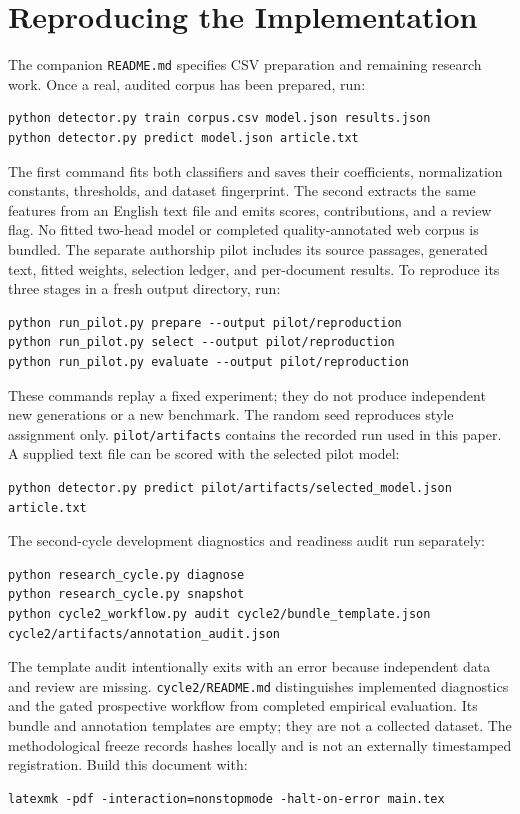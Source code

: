 \documentclass[11pt]{article}
\begin{document}
\appendix
\section{Reproducing the Implementation}
The companion \texttt{README.md} specifies CSV preparation and remaining
research work. Once a real, audited corpus has been prepared, run:
\begin{lstlisting}
python detector.py train corpus.csv model.json results.json
python detector.py predict model.json article.txt
\end{lstlisting}
The first command fits both classifiers and saves their coefficients,
normalization constants, thresholds, and dataset fingerprint. The second
extracts the same features from an English text file and emits scores,
contributions, and a review flag. No fitted two-head model or completed
quality-annotated web corpus is bundled. The separate authorship pilot includes
its source passages, generated text, fitted weights, selection ledger, and
per-document results. To reproduce its three stages in a fresh output
directory, run:
\begin{lstlisting}
python run_pilot.py prepare --output pilot/reproduction
python run_pilot.py select --output pilot/reproduction
python run_pilot.py evaluate --output pilot/reproduction
\end{lstlisting}
These commands replay a fixed experiment; they do not produce independent
new generations or a new benchmark. The random seed reproduces style
assignment only. \texttt{pilot/artifacts} contains the recorded run used in
this paper. A supplied text file can be scored with the selected pilot model:
\begin{lstlisting}
python detector.py predict pilot/artifacts/selected_model.json article.txt
\end{lstlisting}
The second-cycle development diagnostics and readiness audit run separately:
\begin{lstlisting}
python research_cycle.py diagnose
python research_cycle.py snapshot
python cycle2_workflow.py audit cycle2/bundle_template.json cycle2/artifacts/annotation_audit.json
\end{lstlisting}
The template audit intentionally exits with an error because independent
data and review are missing. \texttt{cycle2/README.md} distinguishes
implemented diagnostics and the gated prospective workflow from completed
empirical evaluation. Its bundle and annotation templates are empty; they
are not a collected dataset.
The methodological freeze records hashes locally and is not an externally
timestamped registration. Build this document with:
\begin{lstlisting}
latexmk -pdf -interaction=nonstopmode -halt-on-error main.tex
\end{lstlisting}
\end{document}
